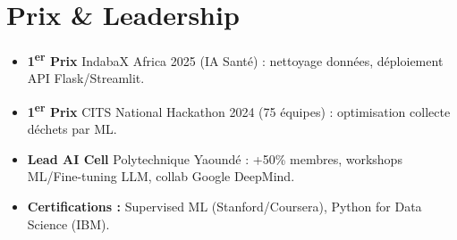 \documentclass[a4paper,11pt]{article}
\begin{document}
\section{Prix \& Leadership}
\begin{itemize}[leftmargin=*, label=\tiny$\bullet$, nosep]
    \item \small{\textbf{1\textsuperscript{er} Prix} IndabaX Africa 2025 (IA Santé) : nettoyage données, déploiement API Flask/Streamlit.}
    \item \small{\textbf{1\textsuperscript{er} Prix} CITS National Hackathon 2024 (75 équipes) : optimisation collecte déchets par ML.}
    \item \small{\textbf{Lead AI Cell} Polytechnique Yaoundé : +50\% membres, workshops ML/Fine-tuning LLM, collab Google DeepMind.}
    \item \small{\textbf{Certifications :} Supervised ML (Stanford/Coursera), Python for Data Science (IBM).}
\end{itemize}
\end{document}
